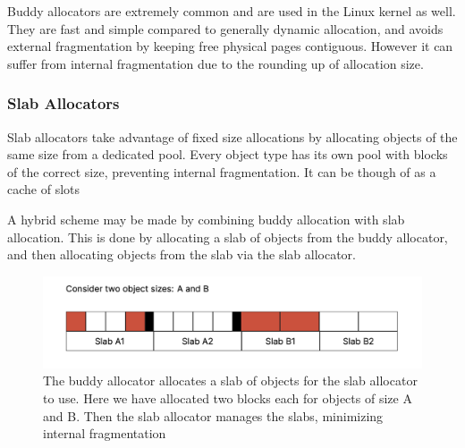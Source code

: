 \documentclass[../notes.tex]{subfiles}
\begin{document}
Buddy allocators are extremely common and are used in the Linux kernel as well.
They are fast and simple compared to generally dynamic allocation, and avoids external fragmentation by keeping free physical pages contiguous. However it can suffer from internal fragmentation due to the rounding up of allocation size.



\subsubsection{Slab Allocators}

Slab allocators take advantage of fixed size allocations by allocating objects of the same size from a dedicated pool.
Every object type has its own pool with blocks of the correct size, preventing internal fragmentation.
It can be though of as a cache of slots


A hybrid scheme may be made by combining buddy allocation with slab allocation. This is done by allocating a slab of objects from the buddy allocator, and then allocating objects from the slab via the slab allocator.


\begin{figure}[H]
    \centering
    \includegraphics[width=0.8\linewidth]{img/image_2023-04-03-15-32-17.png}
    \caption{The buddy allocator allocates a slab of objects for the slab allocator to use. Here we have allocated two blocks each for objects of size A and B. Then the slab allocator manages the slabs, minimizing internal fragmentation}
\end{figure}
\end{document}
